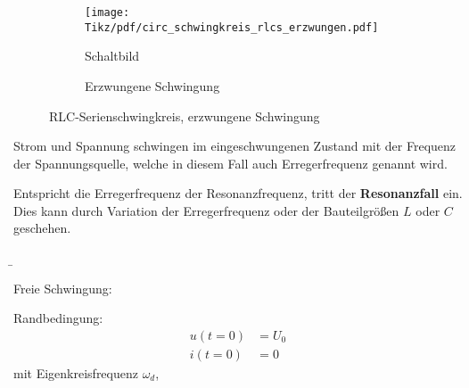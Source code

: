 \begin{frame}
{    \begin{figure}[H]\centering
        \begin{subfigure}{0.4\textwidth}\centering
            \texttt{[image: Tikz/pdf/circ\_schwingkreis\_rlcs\_erzwungen.pdf]}%
            \caption{Schaltbild}
            \label{fig:resonanzkreise:rlcs:erzwungen:circ}
        \end{subfigure}\hfill%
        \begin{subfigure}{0.58\textwidth}\centering
            \caption{Erzwungene Schwingung}
            \label{fig:resonanzkreise:rlcs:erzwungen:plot}
        \end{subfigure}
    \caption{RLC-Serienschwingkreis, erzwungene Schwingung}
    \label{fig:resonanzkreise:rlcs:erzwungen}
    \end{figure}

    Strom und Spannung schwingen im eingeschwungenen Zustand mit der Frequenz der Spannungsquelle, 
    welche in diesem Fall auch Erregerfrequenz genannt wird. 

    Entspricht die Erregerfrequenz der Resonanzfrequenz, tritt der \textbf{Resonanzfall} ein.
    Dies kann durch Variation der Erregerfrequenz oder der Bauteilgrößen $L$ oder $C$ geschehen.
}%
\b{%
\noindent\begin{minipage}[c][4cm][c]{\textwidth}\centering%
    \begin{minipage}[c][4cm][c]{0.25\textwidth}\centering%
    \end{minipage}\hfill%
    \begin{minipage}[c][4cm][c]{0.38\textwidth}\centering%
        Freie Schwingung:\newline
    \end{minipage}\hfill%
    \begin{minipage}[c][4cm][c]{0.35\textwidth}%
        Randbedingung:
        \begin{equation*}\begin{aligned}
            u(t=0) &= U_0\\
            i(t=0) &= 0%
        \end{aligned}\end{equation*}
        \quad mit Eigenkreisfrequenz $\omega_d$,


\end{minipage}
\end{minipage}}
\end{frame}

